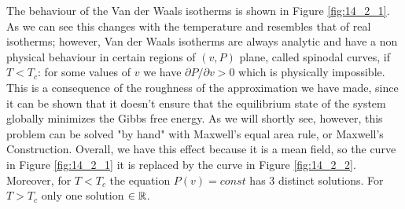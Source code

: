 \documentclass[../main/main.tex]{subfiles}
\begin{document}
The behaviour of the Van der Waals isotherms is shown in Figure \ref{fig:14_2_1}. As we can see this changes with the temperature and resembles that of real isotherms; however, Van der Waals isotherms are always analytic and have a non physical behaviour in certain regions of \( (v,P)\) plane, called spinodal curves, if \( T < T_c\): for some values of \(v\) we have \( \partial P / \partial v >0\) which is physically impossible. This is a consequence of the roughness of the approximation we have made, since it can be shown that it doesn't ensure that the equilibrium state of the system globally minimizes the Gibbs free energy. As we will shortly see, however, this problem can be solved "by hand" with Maxwell's equal area rule, or Maxwell's Construction. Overall, we have this effect because it is a mean field, so the curve in Figure \ref{fig:14_2_1} it is replaced by the curve in Figure \ref{fig:14_2_2}.
Moreover, for \( T < T_c \) the equation \( P(v) = const \) has 3 distinct solutions. For \( T > T_c \) only one solution \( \in \mathbb{R} \).
\end{document}
